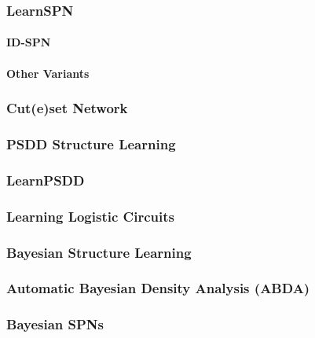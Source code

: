 			\subsubsection{LearnSPN} %

				\paragraph{ID-SPN} %

				\paragraph{Other Variants} %

			\subsubsection{Cut(e)set Network} %

			\subsubsection{PSDD Structure Learning} %

			\subsubsection{LearnPSDD} %

			\subsubsection{Learning Logistic Circuits} %

			\subsubsection{Bayesian Structure Learning} %

			\subsubsection{Automatic Bayesian Density Analysis (ABDA)} %

			\subsubsection{Bayesian SPNs} %

